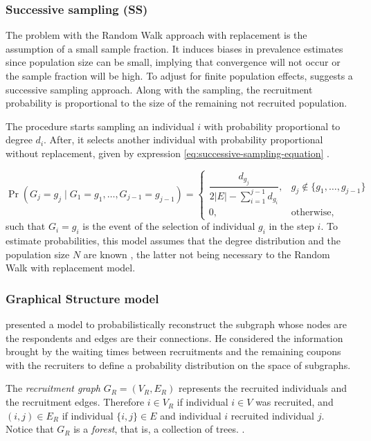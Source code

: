 \subsubsection{Successive sampling (SS)}

The problem with the Random Walk approach with replacement is the assumption
of a small sample fraction. It induces biases in prevalence estimates since
population size can be small, implying that convergence will not occur or the
sample fraction will be high. To adjust for finite population effects,
\textcite{gile2011improved} suggests a successive sampling approach. Along
with the sampling, the recruitment probability is proportional to the size of
the remaining not recruited population.  

The procedure starts sampling an individual $i$ with probability proportional to
degree $d_i$. After, it selects another individual with probability
proportional without replacement, given by expression \eqref{eq:successive-sampling-equation} \cite[p.
136]{gile2011improved}.

\begin{equation}
  \label{eq:successive-sampling-equation}
  \Pr(G_j = g_j \mid G_1 = g_1, \dots, G_{j-1} = g_{j-1}) = \begin{cases}
    \dfrac{d_{g_j}}{2|E| - \sum_{i=1}^{j-1} d_{g_i}}, &g_j \not\in \{g_1, \dots, g_{j-1}\} \\
    0, &\text{otherwise}, 
  \end{cases}
\end{equation}
such that $G_i = g_i$ is the event of the selection of individual $g_i$ in the
step $i$. To estimate probabilities, this model assumes that the degree distribution and the
population size $N$ are known \cite[Table 2, p. 144]{gile2011improved}, the
latter not being necessary to the Random Walk with replacement model. 

\subsubsection{Graphical Structure model}

\textcite{crawford2016} presented a model to probabilistically reconstruct the
subgraph whose nodes are the respondents and edges are their connections. He
considered the information brought by the waiting times between recruitments
and the remaining coupons with the recruiters to define a probability
distribution on the space of subgraphs. 

\begin{definition}
  \label{def:recruitment-graph}
  The {\em recruitment graph} $G_R = (V_R, E_R)$ represents the recruited
  individuals and the recruitment edges. Therefore $i \in V_R$ if individual
  $i \in V$ was recruited, and $(i,j) \in E_R$ if individual $\{i,j\} \in E$ 
  and individual $i$ recruited individual $j$. Notice that $G_R$ is a {\em
  forest}, that is, a collection of trees. \cite[p. 193]{crawford2016}.
\end{definition}

